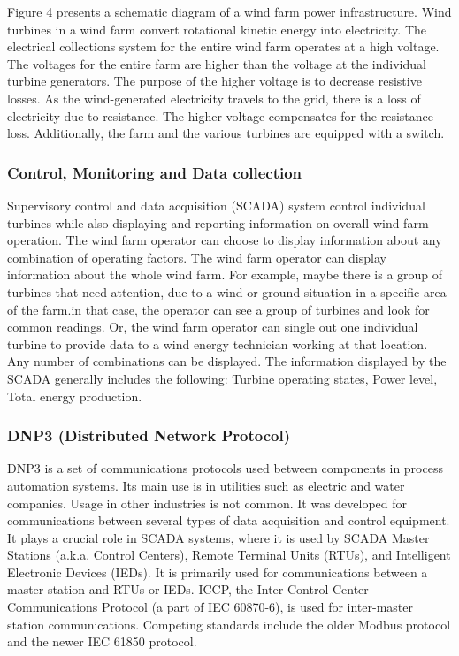 \documentclass[twosided,a4,10pt]{article}
\begin{document}
\begin{multicols}{2}

Figure 4 presents a schematic diagram of a wind farm power infrastructure. Wind turbines in a wind farm convert rotational kinetic energy into electricity. \newline
The electrical collections system for the entire wind farm operates at a high voltage. The voltages for the entire farm are higher than the voltage at the individual turbine generators. The purpose of the higher voltage is to decrease resistive losses. As the wind-generated electricity travels to the grid, there is a loss of electricity due to resistance. The higher voltage compensates for the resistance loss. Additionally, the farm and the various turbines are equipped with a switch.
 \subsubsection{Control, Monitoring and Data collection}
 Supervisory control and data acquisition (SCADA) system control individual turbines while also displaying and reporting information on overall wind farm operation. The wind farm operator can choose to display information about any combination of operating factors.\newline
 The wind farm operator can display information about the whole wind farm. For example, maybe there is a group of turbines that need attention, due to a wind or ground situation in a specific area of the farm.in that case, the operator can see a group of turbines and look for common readings. Or, the wind farm operator can single out one individual turbine to provide data to a wind energy technician working at that location. Any number of combinations can be displayed. The information displayed by the SCADA generally includes the following: Turbine operating states, Power level, Total energy production. \newline
 
 \subsubsection{DNP3 (Distributed Network Protocol)}
 DNP3 is a set of communications protocols used between components in process automation systems. Its main use is in utilities such as electric and water companies. Usage in other industries is not common. It was developed for communications between several types of data acquisition and control equipment. It plays a crucial role in SCADA systems, where it is used by SCADA Master Stations (a.k.a. Control Centers), Remote Terminal Units (RTUs), and Intelligent Electronic Devices (IEDs). It is primarily used for communications between a master station and RTUs or IEDs. ICCP, the Inter-Control Center Communications Protocol (a part of IEC 60870-6), is used for inter-master station communications. Competing standards include the older Modbus protocol and the newer IEC 61850 protocol.
  

\end{multicols}
\end{document}
